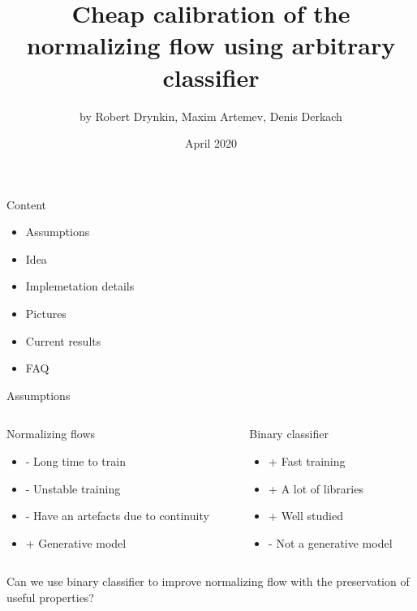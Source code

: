 \documentclass{beamer}
\title{Cheap calibration of the normalizing flow using arbitrary classifier}
\author{by Robert Drynkin, Maxim Artemev, Denis Derkach}
\date{April 2020}
\begin{document}
\maketitle

\begin{frame}{Content}
  \begin{itemize}
    \item Assumptions
    \item Idea
    \item Implemetation details
    \item Pictures
    \item Current results
    \item FAQ
  \end{itemize}
\end{frame}

\begin{frame}{Assumptions}
  
  \begin{columns}[T] %
    \begin{column}{.48\textwidth}

      Normalizing flows
      \begin{itemize}
        \item - Long time to train
        \item - Unstable training
        \item - Have an artefacts due to continuity
        \item + Generative model
      \end{itemize}
    \end{column}%
  \hfill%
  \begin{column}{.48\textwidth}
  
    Binary classifier
    \begin{itemize}
      \item + Fast training
      \item + A lot of libraries
      \item + Well studied
      \item - Not a generative model
    \end{itemize}
  \end{column}%
  \end{columns}

  Can we use binary classifier to improve normalizing flow with the preservation of useful properties?

\end{frame}
\end{document}
